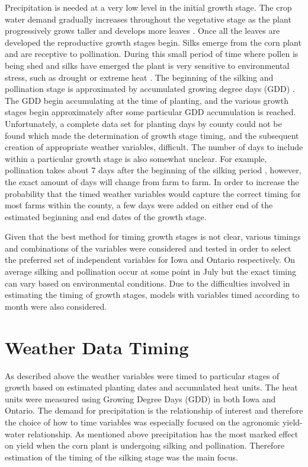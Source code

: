 Precipitation is needed at a very low level in the initial growth stage. The crop water demand gradually increases throughout the vegetative stage as the plant progressively grows taller and develops more leaves \citep{OMAFRA}. Once all the leaves are developed the reproductive growth stages begin. Silks emerge from the corn plant and are receptive to pollination.  During this small period of time where pollen is being shed and silks have emerged the plant is very sensitive to environmental stress, such as drought or extreme heat \citep{OMAFRA}. The beginning of the silking and pollination stage is approximated by accumulated growing degree days (GDD) \cite{neild1987growing}. The GDD begin accumulating at the time of planting, and the various growth stages begin approximately after some particular GDD accumulation is reached. Unfortunately, a complete data set for planting days by county could not be found which made the determination of growth stage timing, and the subsequent creation of appropriate weather variables, difficult. The number of days to include within a particular growth stage is also somewhat unclear. For example, pollination takes about 7 days after the beginning of the silking period \citep{OMAFRA}, however, the exact amount of days will change from farm to farm. In order to increase the probability that the timed weather variables would capture the correct timing for most farms within the county, a few days were added on either end of the estimated beginning and end dates of the growth stage.

Given that the best method for timing growth stages is not clear, various timings and combinations of the variables were considered and tested in order to select the preferred set of independent variables for Iowa and Ontario respectively. On average silking and pollination occur at some point in July but the exact timing can vary based on environmental conditions.  Due to the difficulties involved in estimating the timing of growth stages, models with variables timed according to month were also considered. 

\section{Weather Data Timing}

As described above the weather variables were timed to particular stages of growth based on estimated planting dates and accumulated heat units. The heat units were measured using Growing Degree Days (GDD) in both Iowa and Ontario. The demand for precipitation is the relationship of interest and therefore the choice of how to time variables was especially focused on the agronomic yield-water relationship. As mentioned above precipitation has the most marked effect on yield when the corn plant is undergoing silking and pollination. Therefore estimation of the timing of the silking stage was the main focus.


